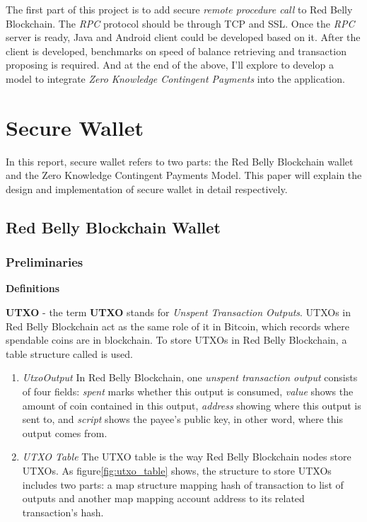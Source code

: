 \documentclass[12pt]{article}
\begin{document}
The first part of this project is to add secure \textit{remote procedure call} to Red Belly Blockchain. The \textit{RPC} protocol should be through TCP and SSL. Once the \textit{RPC} server is ready, Java and Android client could be developed based on it. After the client is developed, benchmarks on speed of balance retrieving and transaction proposing is required. And at the end of the above, I'll explore to develop a model to integrate \textit{Zero Knowledge Contingent Payments} into the application. 

\section{Secure Wallet}

In this report, secure wallet refers to two parts: the Red Belly Blockchain wallet and the Zero Knowledge Contingent Payments Model. This paper will explain the design and implementation of secure wallet in detail respectively.

\subsection{Red Belly Blockchain Wallet}

\subsubsection{Preliminaries}
\label{sec:preliminaries}

\textbf{Definitions\\}

\textbf{UTXO} - the term \textbf{UTXO} stands for \textit{Unspent Transaction Outputs}. UTXOs in Red Belly Blockchain act as the same role of it in Bitcoin, which records where spendable coins are in blockchain. To store UTXOs in Red Belly Blockchain, a table structure called  is used.

\begin{enumerate}
    \item \textit{UtxoOutput} In Red Belly Blockchain, one \textit{unspent transaction output} consists of four fields: \textit{spent} marks whether this output is consumed, \textit{value} shows the amount of coin contained in this output, \textit{address} showing where this output is sent to, and \textit{script} shows the payee's public key, in other word, where this output comes from.

    \item \textit{UTXO Table} The UTXO table is the way Red Belly Blockchain nodes store UTXOs. As figure\ref{fig:utxo_table} shows, the structure to store UTXOs includes two parts: a map structure mapping hash of transaction to list of outputs and another map mapping account address to its related transaction's hash.
\end{enumerate}
\end{document}
